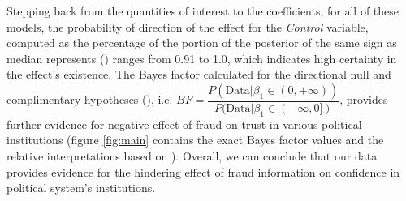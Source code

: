 \documentclass[11pt, ngerman,english,a4]{article}
\begin{document}
Stepping back from the quantities of interest to the coefficients, for all of these models, the probability of direction of the effect for the \textit{Control} variable, computed as the percentage of the portion of the posterior of the same sign as median represents (\citealt{Makowski2019}) ranges from 0.91 to 1.0, which indicates high certainty in the effect's existence.
The Bayes factor calculated for the directional null and complimentary hypotheses (\citealt{_sectionGill2020, Morey2014}), i.e. $BF= \dfrac{P( \text{Data} | \beta_1 \in (0, +\infty))}{ P( \text{Data} |\beta_1 \in (-\infty, 0])}$,  provides further evidence for negative effect of fraud on trust in various political institutions (figure \ref{fig:main} contains the exact Bayes factor values and the relative interpretations based on \citealt{Jeffreys1998}). Overall, we can conclude that our data provides evidence for the hindering effect of fraud information on confidence in political system's institutions.  


\end{document}
